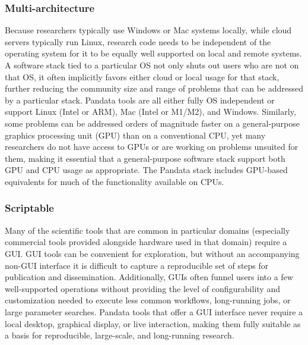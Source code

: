 \subsubsection{Multi-architecture}
Because researchers typically use Windows or Mac systems locally, while cloud servers typically run Linux, research code needs to be independent of the operating system for it to be equally well supported on local and remote systems. A software stack tied to a particular OS not only shuts out users who are not on that OS, it often implicitly favors either cloud or local usage for that stack, further reducing the community size and range of problems that can be addressed by a particular stack. Pandata tools are all either fully OS independent or support Linux (Intel or ARM), Mac (Intel or M1/M2), and Windows. Similarly, some problems can be addressed orders of magnitude faster on a general-purpose graphics processing unit (GPU) than on a conventional CPU, yet many researchers do not have access to GPUs or are working on problems unsuited for them, making it essential that a general-purpose software stack support both GPU and CPU usage as appropriate. The Pandata stack includes GPU-based equivalents for much of the functionality available on CPUs.

\subsubsection{Scriptable}
Many of the scientific tools that are common in particular domains (especially commercial tools provided alongside hardware used in that domain) require a GUI. GUI tools can be convenient for exploration, but without an accompanying non-GUI interface it is difficult to capture a reproducible set of steps for publication and dissemination. Additionally, GUIs often funnel users into a few well-supported operations without providing the level of configurability and customization needed to execute less common workflows, long-running jobs, or large parameter searches. Pandata tools that offer a GUI interface never require a local desktop, graphical display, or live interaction, making them fully suitable as a basis for reproducible, large-scale, and long-running research.

